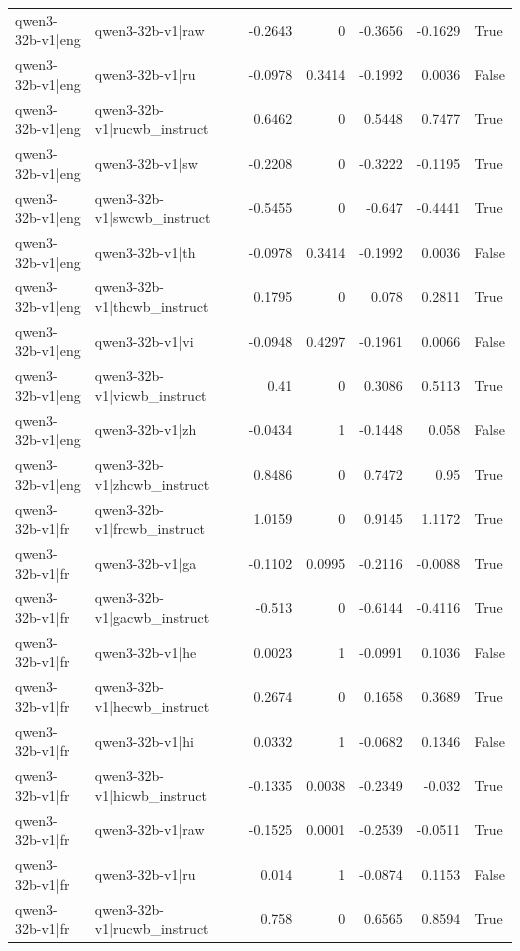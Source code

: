 \begin{table}
\begin{tabular}{l l r r r r l}
qwen3-32b-v1|eng & qwen3-32b-v1|raw & -0.2643 & 0 & -0.3656 & -0.1629 & True \\
qwen3-32b-v1|eng & qwen3-32b-v1|ru & -0.0978 & 0.3414 & -0.1992 & 0.0036 & False \\
qwen3-32b-v1|eng & qwen3-32b-v1|rucwb_instruct & 0.6462 & 0 & 0.5448 & 0.7477 & True \\
qwen3-32b-v1|eng & qwen3-32b-v1|sw & -0.2208 & 0 & -0.3222 & -0.1195 & True \\
qwen3-32b-v1|eng & qwen3-32b-v1|swcwb_instruct & -0.5455 & 0 & -0.647 & -0.4441 & True \\
qwen3-32b-v1|eng & qwen3-32b-v1|th & -0.0978 & 0.3414 & -0.1992 & 0.0036 & False \\
qwen3-32b-v1|eng & qwen3-32b-v1|thcwb_instruct & 0.1795 & 0 & 0.078 & 0.2811 & True \\
qwen3-32b-v1|eng & qwen3-32b-v1|vi & -0.0948 & 0.4297 & -0.1961 & 0.0066 & False \\
qwen3-32b-v1|eng & qwen3-32b-v1|vicwb_instruct & 0.41 & 0 & 0.3086 & 0.5113 & True \\
qwen3-32b-v1|eng & qwen3-32b-v1|zh & -0.0434 & 1 & -0.1448 & 0.058 & False \\
qwen3-32b-v1|eng & qwen3-32b-v1|zhcwb_instruct & 0.8486 & 0 & 0.7472 & 0.95 & True \\
qwen3-32b-v1|fr & qwen3-32b-v1|frcwb_instruct & 1.0159 & 0 & 0.9145 & 1.1172 & True \\
qwen3-32b-v1|fr & qwen3-32b-v1|ga & -0.1102 & 0.0995 & -0.2116 & -0.0088 & True \\
qwen3-32b-v1|fr & qwen3-32b-v1|gacwb_instruct & -0.513 & 0 & -0.6144 & -0.4116 & True \\
qwen3-32b-v1|fr & qwen3-32b-v1|he & 0.0023 & 1 & -0.0991 & 0.1036 & False \\
qwen3-32b-v1|fr & qwen3-32b-v1|hecwb_instruct & 0.2674 & 0 & 0.1658 & 0.3689 & True \\
qwen3-32b-v1|fr & qwen3-32b-v1|hi & 0.0332 & 1 & -0.0682 & 0.1346 & False \\
qwen3-32b-v1|fr & qwen3-32b-v1|hicwb_instruct & -0.1335 & 0.0038 & -0.2349 & -0.032 & True \\
qwen3-32b-v1|fr & qwen3-32b-v1|raw & -0.1525 & 0.0001 & -0.2539 & -0.0511 & True \\
qwen3-32b-v1|fr & qwen3-32b-v1|ru & 0.014 & 1 & -0.0874 & 0.1153 & False \\
qwen3-32b-v1|fr & qwen3-32b-v1|rucwb_instruct & 0.758 & 0 & 0.6565 & 0.8594 & True \\

\end{tabular}
\end{table}
